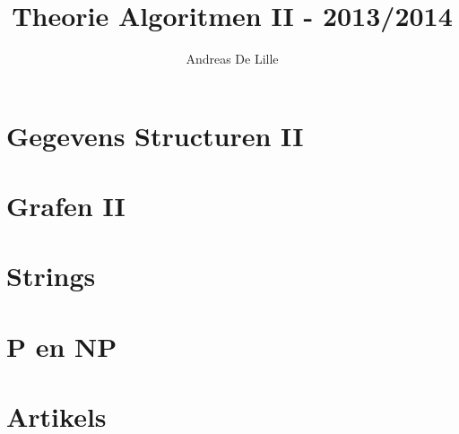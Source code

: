 \documentclass[11pt,a4paper,oneside]{book}
\begin{document}
\title{Theorie Algoritmen II - 2013/2014}
\author{Andreas De Lille}
\renewcommand{\today}{Augustus 2014}
\maketitle

\frontmatter
\renewcommand{\baselinestretch}{1.08} 	%
\small\normalsize                       %
\tableofcontents
\renewcommand{\baselinestretch}{1.2} 	%
\small\normalsize                       %

\mainmatter
\part{Gegevens Structuren II}
\part{Grafen II}

\part{Strings}



\part{P en NP}
\part{Artikels}
\end{document}

